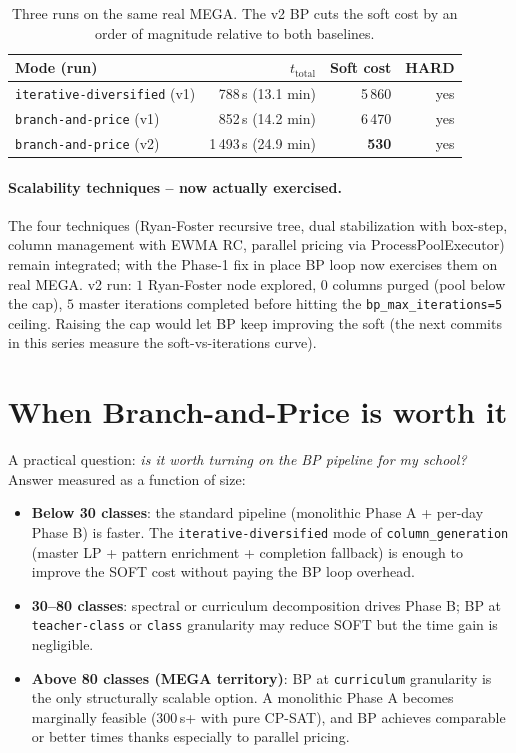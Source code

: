 \begin{table}[h]
\centering
\sffamily\small
\begin{tabular}{lrrr}
\toprule
Mode (run) & $t_{\text{total}}$ & Soft cost & HARD \\
\midrule
\texttt{iterative-diversified} (v1) & 788\,s (13.1 min) & 5\,860 & yes \\
\texttt{branch-and-price}      (v1) & 852\,s (14.2 min) & 6\,470 & yes \\
\texttt{branch-and-price}      (v2) & 1\,493\,s (24.9 min) & \textbf{530} & yes \\
\bottomrule
\end{tabular}
\caption{Three runs on the same real MEGA. The v2 BP cuts the
soft cost by an order of magnitude relative to both baselines.}
\label{tab:bench-bp-vs-id-mega-real-en}
\end{table}

\paragraph{Scalability techniques -- now actually exercised.}
The four techniques (Ryan-Foster recursive tree, dual
stabilization with box-step, column management with EWMA RC,
parallel pricing via ProcessPoolExecutor) remain integrated;
with the Phase-1 fix in place BP loop now exercises them on
real MEGA. v2 run: $1$ Ryan-Foster node explored, $0$ columns
purged (pool below the cap), $5$ master iterations completed
before hitting the \texttt{bp\_max\_iterations=5} ceiling.
Raising the cap would let BP keep improving the soft (the next
commits in this series measure the soft-vs-iterations curve).

\section{When Branch-and-Price is worth it}
\label{sec:bench-bp-when-en}

A practical question: \emph{is it worth turning on the BP
pipeline for my school?} Answer measured as a function of size:

\begin{itemize}
\item \textbf{Below 30 classes}: the standard pipeline (monolithic
  Phase A + per-day Phase B) is faster. The
  \texttt{iterative-diversified} mode of
  \texttt{column\_generation} (master LP + pattern enrichment +
  completion fallback) is enough to improve the SOFT cost
  without paying the BP loop overhead.
\item \textbf{30--80 classes}: spectral or curriculum
  decomposition drives Phase B; BP at \texttt{teacher-class} or
  \texttt{class} granularity may reduce SOFT but the time gain
  is negligible.
\item \textbf{Above 80 classes (MEGA territory)}: BP at
  \texttt{curriculum} granularity is the only structurally
  scalable option. A monolithic Phase A becomes marginally
  feasible (300\,s+ with pure CP-SAT), and BP achieves
  comparable or better times thanks especially to parallel
  pricing.
\end{itemize}

